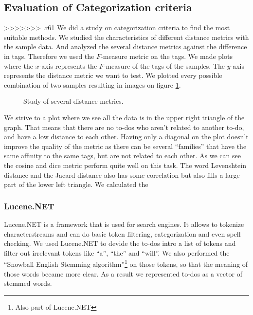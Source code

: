\documentclass[a4paper,titlepage]{article}
\begin{document}
\subsection{Evaluation of Categorization criteria}
>>>>>>> .r61
We did a study on categorization criteria to find the most suitable methods. We studied the characteristics of different distance metrics with the sample data. And analyzed the several distance metrics against the difference in tags. Therefore we used the $F$-measure metric on the tags. We made plots where the $x$-axis represents the $F$-measure of the tags of the samples. The $y$-axis represents the distance metric we want to test. We plotted every possible combination of two samples resulting in images on figure \ref{fig:metricStudy}.
\begin{figure}
\centering
{}
\caption{Study of several distance metrics.}
\label{fig:metricStudy}
\end{figure}
We strive to a plot where we see all the data is in the upper right triangle of the graph. That means that there are no to-dos who aren't related to another to-do, and have a low distance to each other. Having only a diagonal on the plot doesn't improve the quality of the metric as there can be several ``families'' that have the same affinity to the same tags, but are not related to each other. As we can see the cosine and dice metric perform quite well on this task. The word Levenshtein distance and the Jacard distance also has some correlation but also fills a large part of the lower left triangle. We calculated the 
\subsubsection{Lucene.NET}
Lucene.NET is a framework that is used for search engines. It allows to tokenize characterstreams and can do basic token filtering, categorization and even spell checking. We used Lucene.NET to devide the to-dos intro a list of tokens and filter out irrelevant tokens like ``a'', ``the'' and ``will''. We also performed the ``Snowball English Stemming algorithm''\footnote{Also part of Lucene.NET} on those tokens, so that the meaning of those words became more clear. As a result we represented to-dos as a vector of stemmed words.
\end{document}
